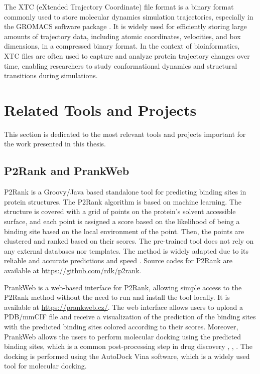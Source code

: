 The XTC (eXtended Trajectory Coordinate) file format is a binary format commonly used to store molecular dynamics simulation trajectories, especially in the GROMACS software package \cite{van2005gromacs}. It is widely used for efficiently storing large amounts of trajectory data, including atomic coordinates, velocities, and box dimensions, in a compressed binary format. In the context of bioinformatics, XTC files are often used to capture and analyze protein trajectory changes over time, enabling researchers to study conformational dynamics and structural transitions during simulations.

\section{Related Tools and Projects}
\label{sec:related-tools}

This section is dedicated to the most relevant tools and projects important for the work presented in this thesis.

\subsection{P2Rank and PrankWeb}
\label{sec:prankweb-p2rank}

P2Rank is a Groovy/Java based standalone tool for predicting binding sites in protein structures. The P2Rank algorithm is based on machine learning. The structure is covered with a grid of points on the protein's solvent accessible surface, and each point is assigned a score based on the likelihood of being a binding site based on the local environment of the point. Then, the points are clustered and ranked based on their scores. The pre-trained tool does not rely on any external databases nor templates. The method is widely adapted due to its reliable and accurate predictions and speed \cite{krivak2018p2rank}. Source codes for P2Rank are available at \url{https://github.com/rdk/p2rank}.

PrankWeb is a web-based interface for P2Rank, allowing simple access to the P2Rank method without the need to run and install the tool locally. It is available at \url{https://prankweb.cz/}. The web interface allows users to upload a PDB/mmCIF file and receive a visualization of the prediction of the binding sites with the predicted binding sites colored according to their scores. Moreover, PrankWeb allows the users to perform molecular docking using the predicted binding sites, which is a common post-processing step in drug discovery \cite{polak2025prankweb}, \cite{jakubec2022prankweb}, \cite{jendele2019prankweb}. The docking is performed using the AutoDock Vina \cite{trott2010autodock} software, which is a widely used tool for molecular docking.

